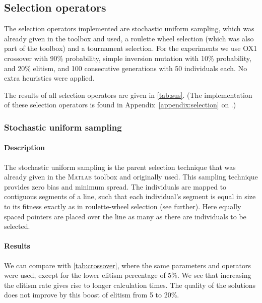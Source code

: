 ﻿\documentclass[a4paper,english,11pt,]{scrartcl}
\begin{document}
\subsection{Selection operators}

The selection operators implemented are stochastic uniform sampling, which was already given in the toolbox and used, a roulette wheel selection (which was also part of the toolbox) and a tournament selection. %
For the experiments we use OX1 crossover with 90\% probability, simple inversion mutation with 10\% probability, and 20\% elitism, and 100 consecutive generations with 50 individuals each. No extra heuristics were applied.  

The results of all selection operators are given in \autoref{tab:sus}. (The implementation of these selection operators is found in Appendix~\ref{appendix:selection} on .)
\subsubsection{Stochastic uniform sampling}
\paragraph{Description}
The stochastic uniform sampling is the parent selection technique that was already given in the \textsc{Matlab} toolbox and originally used. 
This sampling technique provides zero bias and minimum spread. The individuals are mapped to contiguous segments of a line, such that each individual's segment is equal in size to its fitness exactly as in roulette-wheel selection (see further). Here equally spaced pointers are placed over the line as many as there are individuals to be selected.



\paragraph{Results}
We can compare with \autoref{tab:crossover}, where the same parameters and operators were used, except for the lower elitism percentage of 5\%. We see that increasing the elitism rate gives rise to longer calculation times. The quality of the solutions does not improve by this boost of elitism from 5 to 20\%. 
\end{document}
